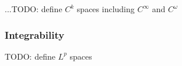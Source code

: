 ...TODO: define $C^k$ spaces including $C^\infty$ and $C^\omega$



\subsubsection{Integrability} TODO: define $L^p$ spaces






